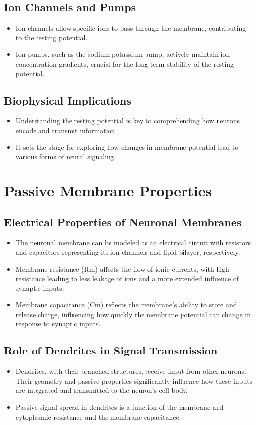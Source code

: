\documentclass{article}
\begin{document}
\subsection{Ion Channels and Pumps}
\begin{itemize}
    \item Ion channels allow specific ions to pass through the membrane, contributing to the resting potential.
    \item Ion pumps, such as the sodium-potassium pump, actively maintain ion concentration gradients, crucial for the long-term stability of the resting potential.
\end{itemize}

\subsection{Biophysical Implications}
\begin{itemize}
    \item Understanding the resting potential is key to comprehending how neurons encode and transmit information.
    \item It sets the stage for exploring how changes in membrane potential lead to various forms of neural signaling.
\end{itemize}
\section{Passive Membrane Properties}

\subsection{Electrical Properties of Neuronal Membranes}
\begin{itemize}
    \item The neuronal membrane can be modeled as an electrical circuit with resistors and capacitors representing its ion channels and lipid bilayer, respectively.
    \item Membrane resistance (Rm) affects the flow of ionic currents, with high resistance leading to less leakage of ions and a more extended influence of synaptic inputs.
    \item Membrane capacitance (Cm) reflects the membrane's ability to store and release charge, influencing how quickly the membrane potential can change in response to synaptic inputs.
\end{itemize}

\subsection{Role of Dendrites in Signal Transmission}
\begin{itemize}
    \item Dendrites, with their branched structures, receive input from other neurons. Their geometry and passive properties significantly influence how these inputs are integrated and transmitted to the neuron's cell body.
    \item Passive signal spread in dendrites is a function of the membrane and cytoplasmic resistance and the membrane capacitance.
\end{itemize}
\end{document}
